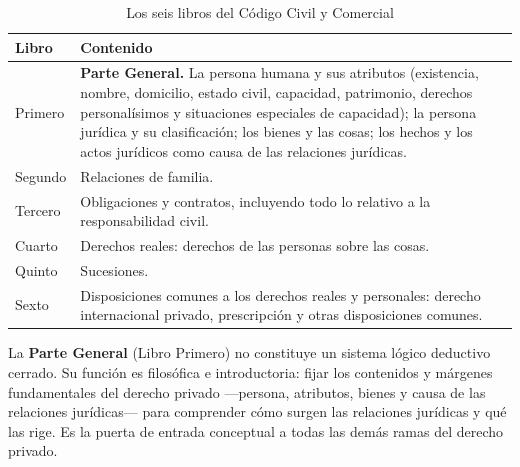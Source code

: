 \documentclass[12pt,oneside]{book}
\begin{document}
\begin{table}[H]
\centering
\begin{tabularx}{\textwidth}{B{0.17\textwidth} Y}
\toprule
\textbf{Libro} & \textbf{Contenido} \\
\midrule
Primero & \textbf{Parte General.} La persona humana y sus atributos (existencia, nombre, domicilio, estado civil, capacidad, patrimonio, derechos personalísimos y situaciones especiales de capacidad); la persona jurídica y su clasificación; los bienes y las cosas; los hechos y los actos jurídicos como causa de las relaciones jurídicas. \\
Segundo & Relaciones de familia. \\
Tercero & Obligaciones y contratos, incluyendo todo lo relativo a la responsabilidad civil. \\
Cuarto & Derechos reales: derechos de las personas sobre las cosas. \\
Quinto & Sucesiones. \\
Sexto & Disposiciones comunes a los derechos reales y personales: derecho internacional privado, prescripción y otras disposiciones comunes. \\
\bottomrule
\end{tabularx}
\caption{Los seis libros del Código Civil y Comercial}
\end{table}

\begin{importante}
La \textbf{Parte General} (Libro Primero) no constituye un sistema lógico deductivo cerrado. Su función es filosófica e introductoria: fijar los contenidos y márgenes fundamentales del derecho privado ---persona, atributos, bienes y causa de las relaciones jurídicas--- para comprender cómo surgen las relaciones jurídicas y qué las rige. Es la puerta de entrada conceptual a todas las demás ramas del derecho privado.
\end{importante}
\end{document}
